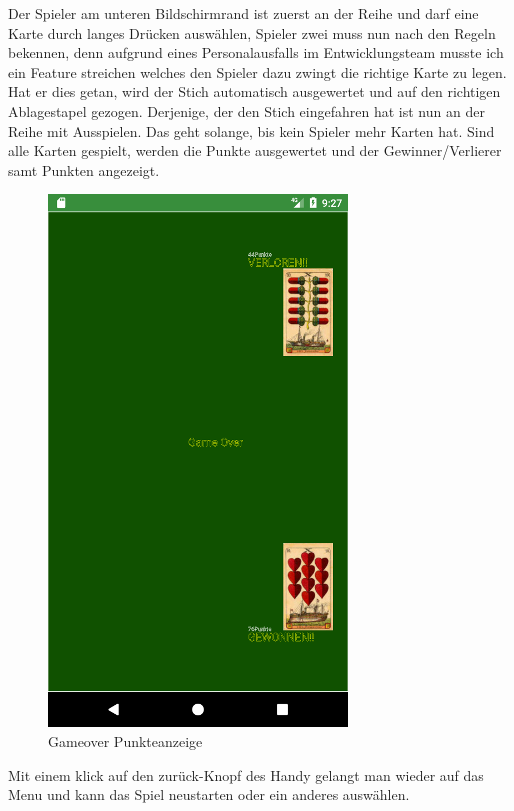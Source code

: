 Der Spieler am unteren Bildschirmrand ist zuerst an der Reihe und darf eine Karte durch langes Drücken auswählen, Spieler zwei muss nun nach den Regeln bekennen, denn aufgrund eines Personalausfalls im Entwicklungsteam musste ich ein Feature streichen welches den Spieler dazu zwingt die richtige Karte zu legen. Hat er dies getan, wird der Stich automatisch ausgewertet und auf den richtigen Ablagestapel gezogen. Derjenige, der den Stich eingefahren hat ist nun an der Reihe mit Ausspielen. Das geht solange, bis kein Spieler mehr Karten hat. Sind alle Karten gespielt, werden die Punkte ausgewertet und der Gewinner/Verlierer samt Punkten angezeigt.
\begin{figure}[h]
	\centering
	\includegraphics{resources/kartenscreens/gameover}
	\caption{Gameover Punkteanzeige}
	\label{fig:gm_uml}
\end{figure}
Mit einem klick auf den zurück-Knopf des Handy gelangt man wieder auf das Menu und kann das Spiel neustarten oder ein anderes auswählen.